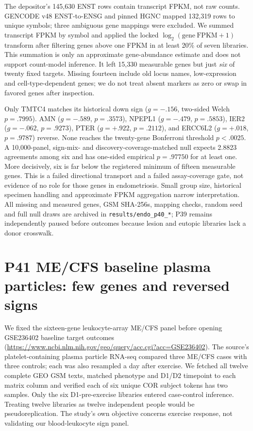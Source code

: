 \documentclass[11pt,a4paper]{article}
\begin{document}
The depositor's 145,630 ENST rows contain transcript FPKM, not raw counts. GENCODE v48 ENST-to-ENSG and pinned HGNC mapped 132,319 rows to unique symbols; three ambiguous gene mappings were excluded. We summed transcript FPKM by symbol and applied the locked $\log_2(\mathrm{gene\ FPKM}+1)$ transform after filtering genes above one FPKM in at least 20\% of seven libraries. This summation is only an approximate gene-abundance estimate and does not support count-model inference. It left 15,330 measurable genes but just \emph{six} of twenty fixed targets. Missing fourteen include old locus names, low-expression and cell-type-dependent genes; we do not treat absent markers as zero or swap in favored genes after inspection.

Only TMTC4 matches its historical down sign ($g=-.156$, two-sided Welch $p=.7995$). AMN ($g=-.589$, $p=.3573$), NPEPL1 ($g=-.479$, $p=.5853$), IER2 ($g=-.062$, $p=.9273$), PTER ($g=+.922$, $p=.2112$), and ERCC6L2 ($g=+.018$, $p=.9787$) reverse. None reaches the twenty-gene Bonferroni threshold $p<.0025$. A 10,000-panel, sign-mix- and discovery-coverage-matched null expects 2.8823 agreements among six and has one-sided empirical $p=.97750$ for at least one. More decisively, six is far below the registered minimum of fifteen measurable genes. This is a failed directional transport and a failed assay-coverage gate, not evidence of no role for those genes in endometriosis. Small group size, historical specimen handling and approximate FPKM aggregation narrow interpretation. All missing and measured genes, GSM SHA-256s, mapping checks, random seed and full null draws are archived in \texttt{results/endo\_p40\_*}; P39 remains independently paused before outcomes because lesion and eutopic libraries lack a donor crosswalk.

\section{P41 ME/CFS baseline plasma particles: few genes and reversed signs}
We fixed the sixteen-gene leukocyte-array ME/CFS panel before opening GSE236402 baseline target outcomes (\url{https://www.ncbi.nlm.nih.gov/geo/query/acc.cgi?acc=GSE236402}). The source's platelet-containing plasma particle RNA-seq compared three ME/CFS cases with three controls; each was also resampled a day after exercise. We fetched all twelve complete GEO GSM texts, matched phenotype and D1/D2 timepoint to each matrix column and verified each of six unique COR subject tokens has two samples. Only the six D1-pre-exercise libraries entered case-control inference. Treating twelve libraries as twelve independent people would be pseudoreplication. The study's own objective concerns exercise response, not validating our blood-leukocyte sign panel.
\end{document}
